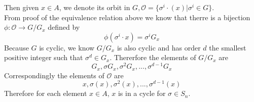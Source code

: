 \documentclass{article}
\begin{document}
Then given $x \in A$, we denote its orbit in $G, \mathcal{O} = \{\sigma^i\cdot(x)| \sigma^i \in G\}$.\\
From proof of the equivalence relation above we know that therre is a bijection $\phi: \mathcal{O} \rightarrow G/G_x$ defined by
\begin{equation*}
    \phi(\sigma^i \cdot x) = \sigma^iG_x
\end{equation*}
Because $G$ is cyclic, we know $G/G_x$ is also cyclic and has order $d$ the smallest positive integer such that $\sigma^d \in G_x$. Thererfore the elements of $G/G_x$ are
\begin{equation*}
    G_x, \sigma G_x, \sigma^2G_x, ..., \sigma^{d-1}G_x
\end{equation*}
Correspondingly the elements of $\mathcal{O}$ are
\begin{equation*}
    x, \sigma(x), \sigma^2(x), ..., \sigma^{d-1}(x)
\end{equation*}
Therefore for each element $x \in A$, $x$ is in a cycle for $\sigma \in S_n$.
\end{document}
